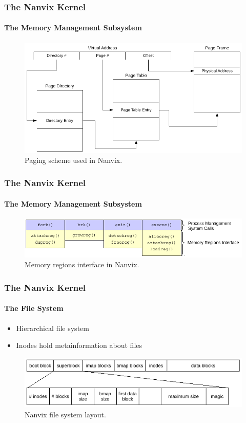 \documentclass{beamer}
\begin{document}
		\begin{frame}
		\frametitle{The Nanvix Kernel}
		\framesubtitle{The Memory Management Subsystem}
			\begin{figure}
				\centering
				\includegraphics[width=\linewidth]{paging-scheme}
				\caption{Paging scheme used in Nanvix.}
			\end{figure}
		\end{frame}

		\begin{frame}
		\frametitle{The Nanvix Kernel}
		\framesubtitle{The Memory Management Subsystem}
			\begin{figure}
				\centering
				\includegraphics[width=\linewidth]{memory-regions-interface}
				\caption{Memory regions interface in Nanvix.}
			\end{figure}
		\end{frame}

		\begin{frame}
		\frametitle{The Nanvix Kernel}
		\framesubtitle{The File System}
			\begin{itemize}
			\setlength\itemsep{1.5em}
				\item Hierarchical file system
				\item Inodes hold metainformation about files
			\end{itemize}
			\begin{figure}
				\centering
				\includegraphics[width=\linewidth]{file-system-layout}
				\caption{Nanvix file system layout.}
			\end{figure}
		\end{frame}
\end{document}
